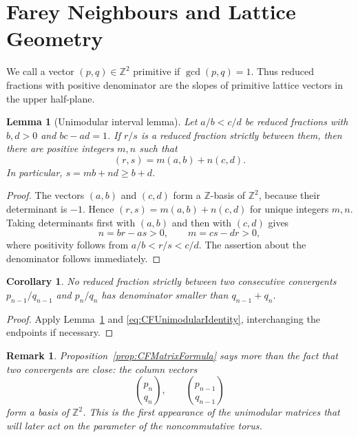 \documentclass{book}
\newtheorem{lemma}[definition]{Lemma}
\newtheorem{remark}[definition]{Remark}
\newtheorem{corollary}[definition]{Corollary}
\begin{document}
\section{Farey Neighbours and Lattice Geometry}

We call a vector \((p,q)\in\mathbb Z^2\) \textnormal{primitive} if
\(\gcd(p,q)=1\). Thus reduced fractions with positive denominator are the
slopes of primitive lattice vectors in the upper half-plane.

\begin{lemma}[Unimodular interval lemma]\label{lem:CFUnimodularInterval}
  Let \(a/b<c/d\) be reduced fractions with \(b,d>0\) and
  \(bc-ad=1\). If \(r/s\) is a reduced fraction strictly between them, then
  there are positive integers \(m,n\) such that
  \[
    (r,s)=m(a,b)+n(c,d).
  \]
  In particular, \(s=mb+nd\geq b+d\).
\end{lemma}

\begin{proof}
  The vectors \((a,b)\) and \((c,d)\) form a \(\mathbb Z\)-basis of
  \(\mathbb Z^2\), because their determinant is \(-1\). Hence
  \((r,s)=m(a,b)+n(c,d)\) for unique integers \(m,n\). Taking determinants
  first with \((a,b)\) and then with \((c,d)\) gives
  \[
    n=br-as>0,
    \qquad
    m=cs-dr>0,
  \]
  where positivity follows from \(a/b<r/s<c/d\). The assertion about the
  denominator follows immediately.
\end{proof}

\begin{corollary}\label{cor:CFNoSmallDenominatorBetweenConvergents}
  No reduced fraction strictly between two consecutive convergents
  \(p_{n-1}/q_{n-1}\) and \(p_n/q_n\) has denominator smaller than
  \(q_{n-1}+q_n\).
\end{corollary}

\begin{proof}
  Apply Lemma~\ref{lem:CFUnimodularInterval} and
  \eqref{eq:CFUnimodularIdentity}, interchanging the endpoints if necessary.
\end{proof}

\begin{remark}
  Proposition~\ref{prop:CFMatrixFormula} says more than the fact that two
  convergents are close: the column vectors
  \[
    \binom{p_n}{q_n},
    \qquad
    \binom{p_{n-1}}{q_{n-1}}
  \]
  form a basis of \(\mathbb Z^2\). This is the first appearance of the
  unimodular matrices that will later act on the parameter of the
  noncommutative torus.
\end{remark}
\end{document}
